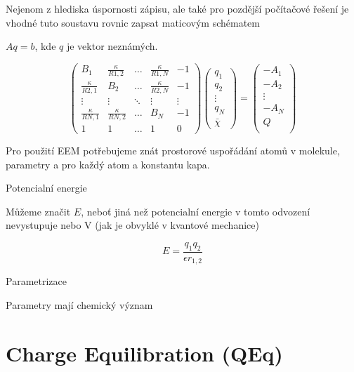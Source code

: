 \documentclass[
  color, %
  table, %
  lof,   %
  lot,   %
]{fithesis3}
\begin{document}
Nejenom z hlediska úspornosti zápisu, ale také pro pozdější počítačové řešení je vhodné tuto soustavu rovnic zapsat maticovým schématem

\(Aq=b\), kde \(q\) je vektor neznámých.

\[
\begin{pmatrix}
B_1 & \frac{\kappa}{R{1,2}} & \dots & \frac{\kappa}{R{1,N}} & -1 \\
\frac{\kappa}{R{2,1}} & B_2 & \dots & \frac{\kappa}{R{2,N}} & -1 \\
\vdots & \vdots & \ddots & \vdots & \vdots \\
\frac{\kappa}{R{N,1}} & \frac{\kappa}{R{N,2}} & \dots & B_N & -1 \\
1 & 1 & \dots & 1 & 0
\end{pmatrix}
\begin{pmatrix}
q_1 \\
q_2 \\
\vdots \\
q_N \\
\bar{\chi}
\end{pmatrix}
=
\begin{pmatrix}
-A_1\\
-A_2\\
\vdots \\
-A_N\\
Q\\
\end{pmatrix}
\]


Pro použití EEM potřebujeme znát prostorové uspořádání atomů v molekule, parametry a pro každý atom a konstantu kapa.

Potencialní energie

Můžeme značit \(E\), neboť jiná než potencialní energie v tomto odvození nevystupuje nebo V (jak je obvyklé v kvantové mechanice)

\[E=\frac{q_1 q_2}{\epsilon r_{1,2}}\]

Parametrizace

Parametry mají chemický význam

\section{Charge Equilibration (QEq)}
\end{document}
